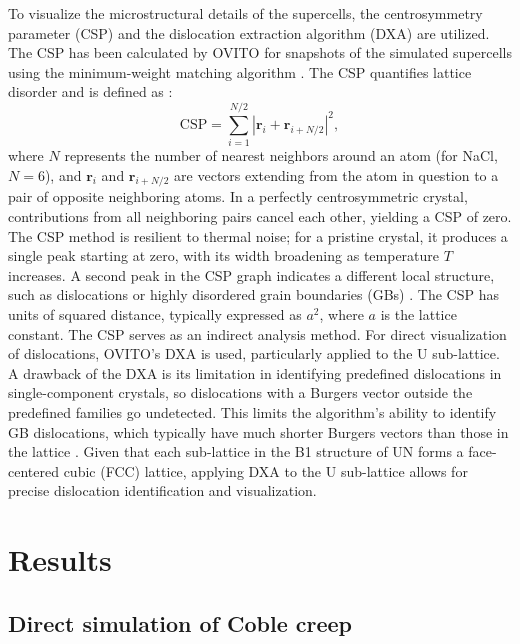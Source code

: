 \documentclass[preprint,12pt,sort&compress]{elsarticle}
\newcommand{\?}{\stackrel{?}{=}}
\begin{document}
To visualize the microstructural details of the supercells, the centrosymmetry parameter (CSP) and the dislocation extraction algorithm (DXA) are utilized. The CSP has been calculated by OVITO for snapshots of the simulated supercells using the minimum-weight matching algorithm \cite{Larsen2020}. The CSP quantifies lattice disorder and is defined as \cite{Kelchner1998}:
\begin{equation}
\mathrm{CSP} = \sum_{i=1}^{N/2} |\mathbf{r}_i + \mathbf{r}_{i+N/2}|^{2},
\end{equation}
where $N$ represents the number of nearest neighbors around an atom (for NaCl, $N = 6$), and $\mathbf{r}_i$ and $\mathbf{r}_{i+N/2}$ are vectors extending from the atom in question to a pair of opposite neighboring atoms. In a perfectly centrosymmetric crystal, contributions from all neighboring pairs cancel each other, yielding a CSP of zero. The CSP method is resilient to thermal noise; for a pristine crystal, it produces a single peak starting at zero, with its width broadening as temperature $T$ increases. A second peak in the CSP graph indicates a different local structure, such as dislocations or highly disordered grain boundaries (GBs) \cite{Bulatov2006, Larsen2020}. The CSP has units of squared distance, typically expressed as $a^2$, where $a$ is the lattice constant. The CSP serves as an indirect analysis method. For direct visualization of dislocations, OVITO's DXA \cite{Stukowski2012} is used, particularly applied to the U sub-lattice. A drawback of the DXA is its limitation in identifying predefined dislocations in single-component crystals, so dislocations with a Burgers vector outside the predefined families go undetected. This limits the algorithm's ability to identify GB dislocations, which typically have much shorter Burgers vectors than those in the lattice \cite{Cai2016}. Given that each sub-lattice in the B1 structure of UN forms a face-centered cubic (FCC) lattice, applying DXA to the U sub-lattice allows for precise dislocation identification and visualization.

\section{Results}

\subsection{Direct simulation of Coble creep}
\label{Sec:CreepResults}
\end{document}
